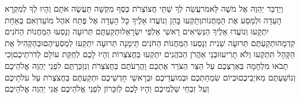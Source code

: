 \documentclass[../main/main.tex]{subfiles}
\begin{document}
\begin{multicols*}{\ncols}
וַיְדַבֵּר יַהְוֶה אֶל מֹשֶׁה לֵּאמֹר\PreVerseSpace{}עֲשֵׂה לְךָ שְׁתֵּי חֲצוֹצְרֹת כֶּסֶף מִקְשָׁה תַּעֲשֶׂה אֹתָם וְהָיוּ לְךָ לְמִקְרָא הָעֵדָה וּלְמַסַּע אֶת הַמַּחֲנוֹת\PreVerseSpace{}וְתָקְעוּ בָּהֵן וְנוֹעֲדוּ אֵלֶיךָ כָּל הָעֵדָה אֶל פֶּתַח אֹהֶל מוֹעֵד\PreVerseSpace{}וְאִם בְּאַחַת יִתְקָעוּ וְנוֹעֲדוּ אֵלֶיךָ הַנְּשִׂיאִים רָאשֵׁי אַלְפֵי יִשְׂרָאֵל\PreVerseSpace{}וּתְקַעְתֶּם תְּרוּעָה וְנָסְעוּ הַמַּחֲנוֹת הַחֹנִים קֵדְמָה\PreVerseSpace{}וּתְקַעְתֶּם תְּרוּעָה שֵׁנִית וְנָסְעוּ הַמַּחֲנוֹת הַחֹנִים תֵּימָנָה תְּרוּעָה יִתְקְעוּ לְמַסְעֵיהֶם\PreVerseSpace{}וּבְהַקְהִיל אֶת הַקָּהָל תִּתְקְעוּ וְלֹא תָרִיעוּ\PreVerseSpace{}וּבְנֵי אַהֲרֹן הַכֹּהֲנִים יִתְקְעוּ בַּחֲצֹצְרוֹת וְהָיוּ לָכֶם לְחֻקַּת עוֹלָם לְדֹרֹתֵיכֶם\PreVerseSpace{}וְכִי תָבֹאוּ מִלְחָמָה בְּאַרְצְכֶם עַל הַצַּר הַצֹּרֵר אֶתְכֶם וַהֲרֵעֹתֶם בַּחֲצֹצְרֹת וְנַזְכַּרְתֶּם לִפְנֵי יַהְוֶה אֱלֹהֵיכֶם וְנוֹשַׁעְתֶּם מֵאֹיְבֵיכֶם\PreVerseSpace{}וּבְיוֹם שִׂמְחַתְכֶם וּבְמוֹעֲדֵיכֶם וּבְרָאשֵׁי חָדְשֵׁיכֶם וּתְקַעְתֶּם בַּחֲצֹצְרֹת עַל עֹלֹתֵיכֶם וְעַל זִבְחֵי שַׁלְמֵיכֶם וְהָיוּ לָכֶם לְזִכָּרוֹן לִפְנֵי אֱלֹהֵיכֶם אֲנִי יַהְוֶה אֱלֹהֵיכֶם\OpenSection{}\par

\end{multicols*}
\end{document}
